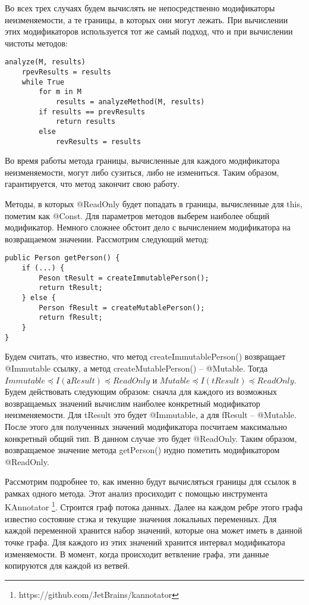 Во всех трех случаях будем вычислять не непосредственно модификаторы неизменяемости, а те границы, в которых они могут лежать. При вычислении этих модификаторов используется тот же самый подход, что и при вычислении чистоты методов:

\begin{lstlisting}[caption=Анализ модификаторов изменяемости для методов, label=code:mutability]
analyze(M, results)
    rpevResults = results    
    while True 
        for m in M 
            results = analyzeMethod(M, results)
        if results == prevResults 
            return results        
        else 
            revResults = results
\end{lstlisting}

Во время работы метода границы, вычисленные для каждого модификатора неизменяемости, могут либо сузиться, либо не измениться. Таким образом, гарантируется, что метод закончит свою работу.

Методы, в которых @ReadOnly будет попадать в границы, вычисленные для this, пометим как @Const. Для параметров методов выберем наиболее общий модификатор. Немного сложнее обстоит дело с вычислением модификатора на возвращаемом значении. Рассмотрим следующий метод:

\begin{lstlisting}[caption=Вывод модификатора неизменяемости для возвращаемого методом значения, label=code:return_value_analyze]
public Person getPerson() {
    if (...) {
        Peson tResult = createImmutablePerson();
        return tResult;
    } else {
        Person fResult = createMutablePerson();
        return fResult;
    } 
} 
\end{lstlisting}

Будем считать, что известно, что метод createImmutablePerson() возвращает @Immutable ссылку, а метод createMutablePerson() -- @Mutable. Тогда $Immutable \preceq I(аResult) \preceq ReadOnly$ и $Mutable \preceq I(tResult) \preceq ReadOnly$. Будем действовать следующим образом: сначла для каждого из возможных возвращаемых значений вычислим наиболее конкретный модификатор неизменяемости. Для tResult это будет @Immutable, а для fResult -- @Mutable. После этого для полученных значений модификатора посчитаем максимально конкретный общий тип. В данном случае это будет @ReadOnly. Таким образом, возвращаемое значение метода getPerson() нудно пометить модификатором @ReadOnly. 

Рассмотрим подробнее то, как именно будут вычисляться границы для ссылок в рамках одного метода. Этот анализ просиходит с помощью инструмента KAnnotator \footnote{https://github.com/JetBrains/kannotator}. Строится граф потока данных. Далее на каждом ребре этого графа известно состояние стэка и текущие значения локальных переменных. Для каждой переменной хранится набор значений, которые она может иметь в данной точке графа. Для каждого из этих значений хранится интервал модификатора изменяемости. В момент, когда происходит ветвление графа, эти данные копируются для каждой из ветвей. 

